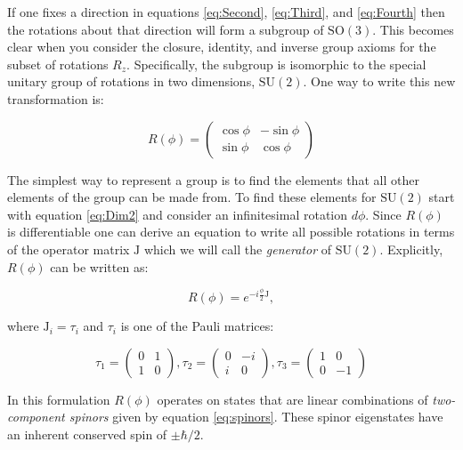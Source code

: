 If one fixes a direction in equations \eqref{eq:Second}, \eqref{eq:Third}, and \eqref{eq:Fourth} then the rotations about that direction will form a subgroup of $\mathrm{SO}(3)$. This becomes clear when you consider the closure, identity, and inverse group axioms for the subset of rotations $R_{z}$. Specifically, the subgroup is isomorphic to the special unitary group of rotations in two dimensions, $\mathrm{SU}(2)$. One way to write this new transformation is: 

\begin{equation}
\label{eq:Dim2}
R(\phi) = \left( \begin{array}{cc}
\cos\phi & -\sin\phi \\
\sin\phi & \cos\phi \end{array} \right)
\end{equation}

The simplest way to represent a group is to find the elements that all other elements of the group can be made from. To find these elements for $\mathrm{SU}(2)$ start with equation \eqref{eq:Dim2} and consider an infinitesimal rotation $d\phi$. Since $R(\phi)$ is differentiable one can derive an equation to write all possible rotations in terms of the operator matrix $\mathrm{J}$ which we will call the \textit{generator} of $\mathrm{SU}(2)$. Explicitly, $R(\phi)$ can be written as:

\begin{equation}
\label{eq:generator}
R(\phi) = e^{-i \frac{\phi}{2} \mathrm{J}},
\end{equation}

where $\mathrm{J}_{i} = \tau_{i}$ and $\tau_{i}$ is one of the Pauli matrices:

\begin{equation}
\label{eq:Pauli}
\tau_{1} = \begin{pmatrix}
    0 & 1\\
    1 & 0
  \end{pmatrix}, \tau_{2} = \begin{pmatrix}
    0 & -i\\
    i & 0
  \end{pmatrix}, \tau_{3} = \begin{pmatrix}
    1 & 0\\
    0 & -1
  \end{pmatrix}
  \end{equation}


In this formulation $R(\phi)$ operates on states that are linear combinations of \textit{two-component spinors} given by equation \eqref{eq:spinors}. These spinor eigenstates have an inherent conserved spin of $\pm\hbar/2$. 

